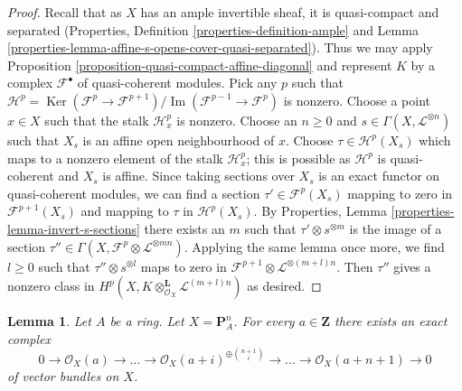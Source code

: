 \documentclass{stacks-project}
\theoremstyle{plain}
\newtheorem{lemma}[subsection]{Lemma}
\theoremstyle{definition}
\theoremstyle{remark}
\numberwithin{equation}{subsection}
\def\Ker{\mathop{\mathrm{Ker}}}
\def\Im{\mathop{\mathrm{Im}}}
\begin{document}
\begin{proof}
Recall that as $X$ has an ample invertible sheaf, it is quasi-compact
and separated (Properties, Definition \ref{properties-definition-ample} and
Lemma \ref{properties-lemma-affine-s-opens-cover-quasi-separated}).
Thus we may apply
Proposition \ref{proposition-quasi-compact-affine-diagonal}
and represent $K$ by a complex $\mathcal{F}^\bullet$ of
quasi-coherent modules. Pick any $p$ such that
$\mathcal{H}^p = \Ker(\mathcal{F}^p \to \mathcal{F}^{p + 1})/
\Im(\mathcal{F}^{p - 1} \to \mathcal{F}^p)$ is nonzero.
Choose a point $x \in X$ such that the stalk $\mathcal{H}^p_x$ is
nonzero. Choose an $n \geq 0$ and $s \in \Gamma(X, \mathcal{L}^{\otimes n})$
such that $X_s$ is an affine open neighbourhood of $x$.
Choose $\tau \in \mathcal{H}^p(X_s)$ which maps to a nonzero
element of the stalk $\mathcal{H}^p_x$; this is possible
as $\mathcal{H}^p$ is quasi-coherent and $X_s$ is affine.
Since taking sections over $X_s$ is an exact functor on
quasi-coherent modules, we can find a section $\tau' \in \mathcal{F}^p(X_s)$
mapping to zero in $\mathcal{F}^{p + 1}(X_s)$ and mapping to
$\tau$ in $\mathcal{H}^p(X_s)$. By
Properties, Lemma \ref{properties-lemma-invert-s-sections}
there exists an $m$ such that $\tau' \otimes s^{\otimes m}$
is the image of a section
$\tau'' \in \Gamma(X, \mathcal{F}^p \otimes \mathcal{L}^{\otimes mn})$.
Applying the same lemma once more, we find $l \geq 0$ such that
$\tau'' \otimes s^{\otimes l}$ maps to zero in
$\mathcal{F}^{p + 1} \otimes \mathcal{L}^{\otimes (m + l)n}$.
Then $\tau''$ gives a nonzero class in
$H^p(X, K \otimes^\mathbf{L}_{\mathcal{O}_X} \mathcal{L}^{(m + l)n})$
as desired.
\end{proof}

\begin{lemma}
\label{lemma-construct-the-next-one}
Let $A$ be a ring. Let $X = \mathbf{P}^n_A$. For every $a \in \mathbf{Z}$
there exists an exact complex
$$
0 \to \mathcal{O}_X(a) \to \ldots
\to \mathcal{O}_X(a + i)^{\oplus {n + 1 \choose i}} \to
\ldots \to \mathcal{O}_X(a + n + 1) \to 0
$$
of vector bundles on $X$.
\end{lemma}
\end{document}
